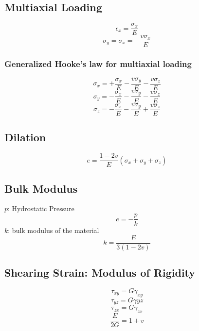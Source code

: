 \documentclass[10pt,landscape]{article}
\begin{document}
\begin{multicols}{3}
\subsection{Multiaxial Loading}
\begin{equation}
    \epsilon_x=\frac{\sigma_x}{E}
\end{equation}
\begin{equation}
    \sigma_y=\sigma_x=-\frac{v\sigma_x}{E}
\end{equation}
\subsubsection{Generalized Hooke's law for multiaxial loading}
\begin{equation}
    \sigma_x=+\frac{\sigma_x}{E}-\frac{v\sigma_y}{E}-\frac{v\sigma_z}{E}
\end{equation}
\begin{equation}
    \sigma_y=-\frac{\sigma_x}{E}-\frac{v\sigma_y}{E}-\frac{v\sigma_z}{E}
\end{equation}
\begin{equation}
    \sigma_z=-\frac{\sigma_x}{E}-\frac{v\sigma_y}{E}+\frac{v\sigma_z}{E}
\end{equation}
\subsection{Dilation}
\begin{equation}
    e=\frac{1-2v}{E}(\sigma_x+\sigma_y+\sigma_z)
\end{equation}
\subsection{Bulk Modulus}
$p$: Hydrostatic Pressure
\begin{equation}
    e=-\frac{p}{k}
\end{equation}
$k$: bulk modulus of the material
\begin{equation}
    k=\frac{E}{3(1-2v)}
\end{equation}
\subsection{Shearing Strain: Modulus of Rigidity}
\begin{equation}
    \tau_{xy}=G\gamma_{xy}
\end{equation}
\begin{equation}
    \tau_{yz}=G\gamma{yz}
\end{equation}
\begin{equation}
    \tau_{zx}=G\gamma_{zx}
\end{equation}
\begin{equation}
    \frac{E}{2G}=1+v
\end{equation}

\end{multicols}
\end{document}
